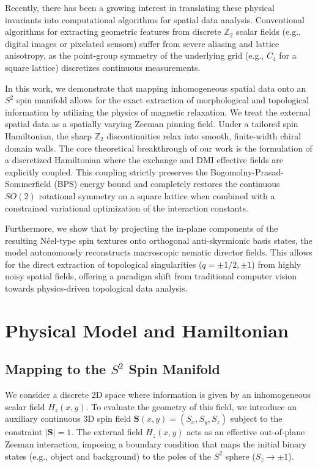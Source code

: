 \documentclass[reprint,amsmath,amssymb,aps,prapplied,longbibliography]{revtex4-2}
\begin{document}
Recently, there has been a growing interest in translating these physical invariants into computational algorithms for spatial data analysis. Conventional algorithms for extracting geometric features from discrete $\mathbb{Z}_2$ scalar fields (e.g., digital images or pixelated sensors) suffer from severe aliasing and lattice anisotropy, as the point-group symmetry of the underlying grid (e.g., $C_4$ for a square lattice) discretizes continuous measurements. 

In this work, we demonstrate that mapping inhomogeneous spatial data onto an $S^2$ spin manifold allows for the exact extraction of morphological and topological information by utilizing the physics of magnetic relaxation. We treat the external spatial data as a spatially varying Zeeman pinning field. Under a tailored spin Hamiltonian, the sharp $\mathbb{Z}_2$ discontinuities relax into smooth, finite-width chiral domain walls. The core theoretical breakthrough of our work is the formulation of a discretized Hamiltonian where the exchange and DMI effective fields are explicitly coupled. This coupling strictly preserves the Bogomolny-Prasad-Sommerfield (BPS) energy bound and completely restores the continuous $SO(2)$ rotational symmetry on a square lattice when combined with a constrained variational optimization of the interaction constants.

Furthermore, we show that by projecting the in-plane components of the resulting Néel-type spin textures onto orthogonal anti-skyrmionic basis states, the model autonomously reconstructs macroscopic nematic director fields. This allows for the direct extraction of topological singularities ($q = \pm 1/2, \pm 1$) from highly noisy spatial fields, offering a paradigm shift from traditional computer vision towards physics-driven topological data analysis.

\section{Physical Model and Hamiltonian}

\subsection{Mapping to the $S^2$ Spin Manifold}
We consider a discrete 2D space where information is given by an inhomogeneous scalar field $H_z(x,y)$. To evaluate the geometry of this field, we introduce an auxiliary continuous 3D spin field $\mathbf{S}(x,y) = (S_x, S_y, S_z)$ subject to the constraint $|\mathbf{S}| = 1$. The external field $H_z(x,y)$ acts as an effective out-of-plane Zeeman interaction, imposing a boundary condition that maps the initial binary states (e.g., object and background) to the poles of the $S^2$ sphere ($S_z \to \pm 1$).
\end{document}
